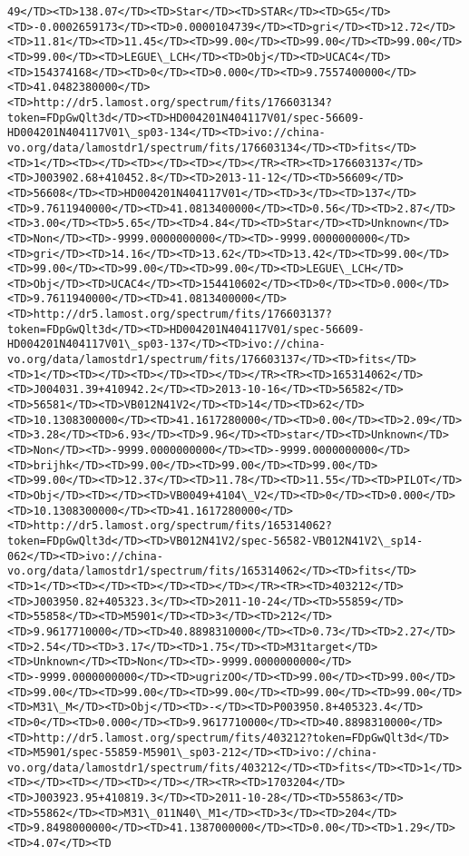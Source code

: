 \documentclass[11pt]{article}
\begin{document}
\begin{Verbatim}[commandchars=\\\{\}]
49</TD><TD>138.07</TD><TD>Star</TD><TD>STAR</TD><TD>G5</TD><TD>-0.0002659173</TD><TD>0.0000104739</TD><TD>gri</TD><TD>12.72</TD><TD>11.81</TD><TD>11.45</TD><TD>99.00</TD><TD>99.00</TD><TD>99.00</TD><TD>99.00</TD><TD>LEGUE\_LCH</TD><TD>Obj</TD><TD>UCAC4</TD><TD>154374168</TD><TD>0</TD><TD>0.000</TD><TD>9.7557400000</TD><TD>41.0482380000</TD><TD>http://dr5.lamost.org/spectrum/fits/176603134?token=FDpGwQlt3d</TD><TD>HD004201N404117V01/spec-56609-HD004201N404117V01\_sp03-134</TD><TD>ivo://china-vo.org/data/lamostdr1/spectrum/fits/176603134</TD><TD>fits</TD><TD>1</TD><TD></TD><TD></TD><TD></TD></TR><TR><TD>176603137</TD><TD>J003902.68+410452.8</TD><TD>2013-11-12</TD><TD>56609</TD><TD>56608</TD><TD>HD004201N404117V01</TD><TD>3</TD><TD>137</TD><TD>9.7611940000</TD><TD>41.0813400000</TD><TD>0.56</TD><TD>2.87</TD><TD>3.00</TD><TD>5.65</TD><TD>4.84</TD><TD>Star</TD><TD>Unknown</TD><TD>Non</TD><TD>-9999.0000000000</TD><TD>-9999.0000000000</TD><TD>gri</TD><TD>14.16</TD><TD>13.62</TD><TD>13.42</TD><TD>99.00</TD><TD>99.00</TD><TD>99.00</TD><TD>99.00</TD><TD>LEGUE\_LCH</TD><TD>Obj</TD><TD>UCAC4</TD><TD>154410602</TD><TD>0</TD><TD>0.000</TD><TD>9.7611940000</TD><TD>41.0813400000</TD><TD>http://dr5.lamost.org/spectrum/fits/176603137?token=FDpGwQlt3d</TD><TD>HD004201N404117V01/spec-56609-HD004201N404117V01\_sp03-137</TD><TD>ivo://china-vo.org/data/lamostdr1/spectrum/fits/176603137</TD><TD>fits</TD><TD>1</TD><TD></TD><TD></TD><TD></TD></TR><TR><TD>165314062</TD><TD>J004031.39+410942.2</TD><TD>2013-10-16</TD><TD>56582</TD><TD>56581</TD><TD>VB012N41V2</TD><TD>14</TD><TD>62</TD><TD>10.1308300000</TD><TD>41.1617280000</TD><TD>0.00</TD><TD>2.09</TD><TD>3.28</TD><TD>6.93</TD><TD>9.96</TD><TD>star</TD><TD>Unknown</TD><TD>Non</TD><TD>-9999.0000000000</TD><TD>-9999.0000000000</TD><TD>brijhk</TD><TD>99.00</TD><TD>99.00</TD><TD>99.00</TD><TD>99.00</TD><TD>12.37</TD><TD>11.78</TD><TD>11.55</TD><TD>PILOT</TD><TD>Obj</TD><TD></TD><TD>VB0049+4104\_V2</TD><TD>0</TD><TD>0.000</TD><TD>10.1308300000</TD><TD>41.1617280000</TD><TD>http://dr5.lamost.org/spectrum/fits/165314062?token=FDpGwQlt3d</TD><TD>VB012N41V2/spec-56582-VB012N41V2\_sp14-062</TD><TD>ivo://china-vo.org/data/lamostdr1/spectrum/fits/165314062</TD><TD>fits</TD><TD>1</TD><TD></TD><TD></TD><TD></TD></TR><TR><TD>403212</TD><TD>J003950.82+405323.3</TD><TD>2011-10-24</TD><TD>55859</TD><TD>55858</TD><TD>M5901</TD><TD>3</TD><TD>212</TD><TD>9.9617710000</TD><TD>40.8898310000</TD><TD>0.73</TD><TD>2.27</TD><TD>2.54</TD><TD>3.17</TD><TD>1.75</TD><TD>M31target</TD><TD>Unknown</TD><TD>Non</TD><TD>-9999.0000000000</TD><TD>-9999.0000000000</TD><TD>ugrizOO</TD><TD>99.00</TD><TD>99.00</TD><TD>99.00</TD><TD>99.00</TD><TD>99.00</TD><TD>99.00</TD><TD>99.00</TD><TD>M31\_M</TD><TD>Obj</TD><TD>-</TD><TD>P003950.8+405323.4</TD><TD>0</TD><TD>0.000</TD><TD>9.9617710000</TD><TD>40.8898310000</TD><TD>http://dr5.lamost.org/spectrum/fits/403212?token=FDpGwQlt3d</TD><TD>M5901/spec-55859-M5901\_sp03-212</TD><TD>ivo://china-vo.org/data/lamostdr1/spectrum/fits/403212</TD><TD>fits</TD><TD>1</TD><TD></TD><TD></TD><TD></TD></TR><TR><TD>1703204</TD><TD>J003923.95+410819.3</TD><TD>2011-10-28</TD><TD>55863</TD><TD>55862</TD><TD>M31\_011N40\_M1</TD><TD>3</TD><TD>204</TD><TD>9.8498000000</TD><TD>41.1387000000</TD><TD>0.00</TD><TD>1.29</TD><TD>4.07</TD><TD
\end{Verbatim}
\end{document}
